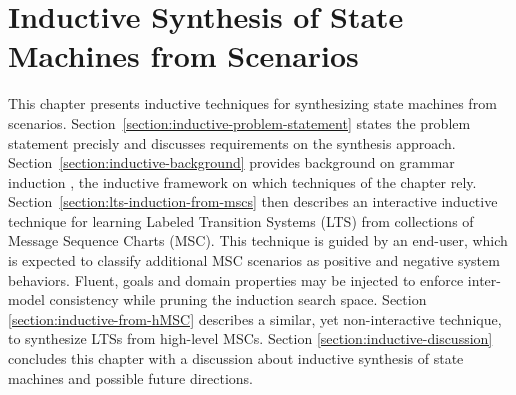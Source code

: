 \chapter{Inductive Synthesis of State Machines from Scenarios\label{chapter:inductive-synthesis}}

This chapter presents inductive techniques for synthesizing state machines from scenarios. Section~\ref{section:inductive-problem-statement} states the problem statement precisly and discusses requirements on the synthesis approach. Section~\ref{section:inductive-background} provides background on grammar induction \cite{Gold:1978}, the inductive framework on which techniques of the chapter rely. Section~\ref{section:lts-induction-from-mscs} then describes an interactive inductive technique for learning Labeled Transition Systems (LTS) from collections of Message Sequence Charts (MSC). This technique is guided by an end-user, which is expected to classify additional MSC scenarios as positive and negative system behaviors. Fluent, goals and domain properties may be injected to enforce inter-model consistency while pruning the induction search space. Section \ref{section:inductive-from-hMSC} describes a similar, yet non-interactive technique, to synthesize LTSs from high-level MSCs. Section \ref{section:inductive-discussion} concludes this chapter with a discussion about inductive synthesis of state machines and possible future directions. 







